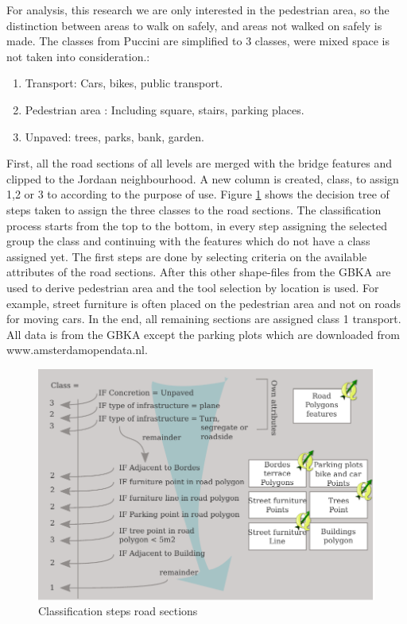 For analysis, this research we are only interested in the pedestrian area, so the distinction between areas to walk on safely, and areas not walked on safely is made. The classes from Puccini are simplified to 3 classes, were mixed space is not taken into consideration.:
\begin{enumerate}
\item Transport: Cars, bikes, public transport. 
\item Pedestrian area : Including square, stairs, parking places. 
\item Unpaved: trees, parks, bank, garden.
\end{enumerate}

First, all the road sections of all levels are merged with the bridge features and clipped to the Jordaan neighbourhood. A new column is created, class, to assign 1,2 or 3 to according to the purpose of use. 
Figure \ref{classRoad} shows the decision tree of steps taken to assign the three classes to the road sections. The classification process starts from the top to the bottom, in every step assigning the selected group the class and continuing with the features which do not have a class assigned yet. The first steps are done by selecting criteria on the available attributes of the road sections. After this other shape-files from the GBKA are used to derive pedestrian area and the tool selection by location is used. For example, street furniture is often placed on the pedestrian area and not on roads for moving cars. In the end, all remaining sections are assigned class 1 transport. All data is from the GBKA except the parking plots which are downloaded from www.amsterdamopendata.nl. 

\begin{figure}[ht]
\includegraphics[width=\textwidth]{img/M_Pedestrianareaclassification.pdf}
\centering
\caption{ Classification steps road sections\label{classRoad}}
\end{figure}


